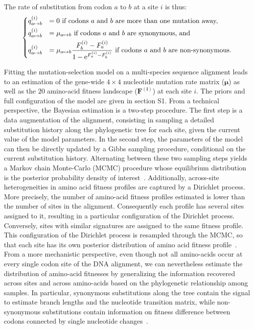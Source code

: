 \documentclass{article}
\newcommand{\UniDimArray}[1]{\bm{#1}}
\newcommand{\e}{\text{e}}
\begin{document}
    The rate of substitution from codon $a$ to $b$ at a site $i$ is thus:
    \begin{equation}
        \begin{dcases}
            q_{a \mapsto b}^{(i)} & = 0 \text{ if codons $a$ and $b$ are more than one mutation away,} \\
            q_{a \mapsto b}^{(i)} & = \mu_{a \mapsto b} \text{ if codons $a$ and $b$ are synonymous, and}\\
            q_{a \mapsto b}^{(i)} & = \mu_{a \mapsto b} \dfrac{F_b^{(i)} - F_a^{(i)}}{1 - \e^{F_a^{(i)} - F_b^{(i)}}} \text{ if codons $a$ and $b$ are non-synonymous}.
        \end{dcases}
    \end{equation}

    Fitting the mutation-selection model on a multi-species sequence alignment leads to an estimation of the gene-wide $4 \times 4$ nucleotide mutation rate matrix ($\UniDimArray{\mu}$) as well as the $20$ amino-acid fitness landscape ($\UniDimArray{F^{(i)}}$) at each site $i$.
    The priors and full configuration of the model are given in section S1.
    From a technical perspective, the Bayesian estimation is a two-step procedure.
    The first step is a data augmentation of the alignment, consisting in sampling a detailed substitution history along the phylogenetic tree for each site, given the current value of the model parameters.
    In the second step, the parameters of the model can then be directly updated by a Gibbs sampling procedure, conditional on the current substitution history.
    Alternating between these two sampling steps yields a Markov chain Monte-Carlo (MCMC) procedure whose equilibrium distribution is the posterior probability density of interest~\cite{lartillot_bayesian_2004, rodrigue_bayesian_2008}.
    Additionally, across-site heterogeneities in amino acid fitness profiles are captured by a Dirichlet process.
    More precisely, the number of amino-acid fitness profiles estimated is lower than the number of sites in the alignment.
    Consequently each profile has several sites assigned to it, resulting in a particular configuration of the Dirichlet process.
    Conversely, sites with similar signatures are assigned to the same fitness profile.
    This configuration of the Dirichlet process is resampled through the MCMC, so that each site has its own posterior distribution of amino acid fitness profile~\cite{rodrigue_mutationselection_2010, lartillot_inference_2013}.
    From a more mechanistic perspective, even though not all amino-acids occur at every single codon site of the DNA alignment, we can nevertheless estimate the distribution of amino-acid fitnesses by generalizing the information recovered across sites and across amino-acids based on the phylogenetic relationship among samples.
    In particular, synonymous substitutions along the tree contain the signal to estimate branch lengths and the nucleotide transition matrix, while non-synonymous substitutions contain information on fitness difference between codons connected by single nucleotide changes~\cite{rodrigue_mutationselection_2010}.
\end{document}
